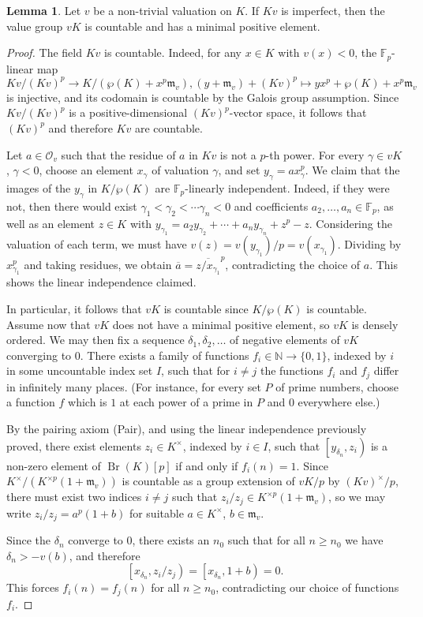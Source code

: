 \documentclass[a4paper, british, oneside]{amsart}
\newcommand{\N}{\mathbb{N}}
\newcommand{\F}{\mathbb{F}}
\DeclareMathOperator{\Br}{Br}
\newcommand{\pair}[2]{\left[{#1}, {#2}\right)}
\theoremstyle{definition}
\newtheorem{lemma}[theorem]{Lemma}
\theoremstyle{remark}
\begin{document}
\begin{lemma}\label{lem:imperfect-implies-uniformiser}
  Let $v$ be a non-trivial valuation on $K$.
  If $Kv$ is imperfect, then the value group $vK$ is countable and has a minimal positive element.
\end{lemma}
\begin{proof}
  The field $Kv$ is countable.
  Indeed, for any $x \in K$ with $v(x) < 0$, the $\F_p$-linear map
  \[ Kv/(Kv)^p \to K/(\wp(K) + x^p \mathfrak{m}_v), (y + \mathfrak{m}_v) + (Kv)^p \mapsto yx^p + \wp(K) + x^p\mathfrak{m}_v \]
  is injective, and its codomain is countable by the Galois group assumption.
  Since $Kv/(Kv)^p$ is a positive-dimensional $(Kv)^p$-vector space,
  it follows that $(Kv)^p$ and therefore $Kv$ are countable.

  Let $a \in \mathcal{O}_v$ such that the residue of $a$ in $Kv$ is not a $p$-th power.
  For every $\gamma \in vK$, $\gamma < 0$, choose an element $x_\gamma$ of valuation $\gamma$, and set $y_\gamma  = a x_\gamma^p$.
  We claim that the images of the $y_\gamma$ in $K/\wp(K)$ are $\F_p$-linearly independent.
  Indeed, if they were not, then there would exist $\gamma_1 < \gamma_2 < \dotsb \gamma_n < 0$ and coefficients $a_2, \dotsc, a_n \in \F_p$, as well as an element $z \in K$ with $y_{\gamma_1} = a_2 y_{\gamma_2} + \dotsb + a_n y_{\gamma_n} +
  z^p - z$.
  Considering the valuation of each term, we must have $v(z) = v(y_{\gamma_1})/p = v(x_{\gamma_1})$.
  Dividing by $x_{\gamma_1}^p$ and taking residues, we obtain $\overline{a} = \overline{z/x_{\gamma_1}}^p$, contradicting the choice of $a$.
  This shows the linear independence claimed.

  In particular, it follows that $vK$ is countable since $K/\wp(K)$ is countable.
  Assume now that $vK$ does not have a minimal positive element, so $vK$ is densely ordered.
  We may then fix a sequence $\delta_1, \delta_2, \dotsc$ of negative elements of $vK$ converging to $0$.
  There exists a family of functions $f_i \in \N \to \{0, 1\}$, indexed by $i$ in some uncountable index set $I$, such that for $i \neq j$ the functions $f_i$ and $f_j$ differ in infinitely many places.
  (For instance, for every set $P$ of prime numbers, choose a function $f$ which is $1$ at each power of a prime in $P$ and $0$ everywhere else.)

  By the pairing axiom (Pair), and using the linear independence previously proved, there exist elements $z_i \in K^\times$, indexed by $i \in I$, such that $\pair{y_{\delta_n}}{z_i}$ is a non-zero element of $\Br(K)[p]$ if and only if $f_i(n) = 1$.
  Since $K^\times/(K^{\times p}(1 + \mathfrak{m}_v))$ is countable as a group extension of $vK/p$ by $(Kv)^\times/p$, there must exist two indices $i \neq j$ such that $z_i/z_j \in K^{\times p} (1 + \mathfrak{m}_v)$, so we may write $z_i/z_j = a^p (1 + b)$ for suitable $a \in K^\times$, $b \in \mathfrak{m}_v$.

  Since the $\delta_n$ converge to $0$, there exists an $n_0$ such that for all $n \geq n_0$ we have $\delta_n > -v(b)$, and therefore
  \[ \pair{x_{\delta_n}}{z_i/z_j} = \pair{x_{\delta_n}}{1+b} = 0. \]
  This forces $f_i(n) = f_j(n)$ for all $n \geq n_0$, contradicting our choice of functions $f_i$.
\end{proof}
\end{document}
